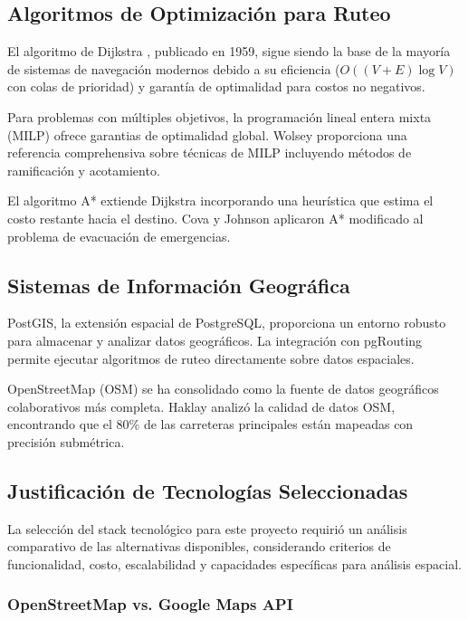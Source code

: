 \documentclass[conference]{IEEEtran}
\begin{document}
\subsection{Algoritmos de Optimización para Ruteo}

El algoritmo de Dijkstra \citep{dijkstra1959}, publicado en 1959, sigue siendo la base de la mayoría de sistemas de navegación modernos debido a su eficiencia ($O((V+E)\log V)$ con colas de prioridad) y garantía de optimalidad para costos no negativos.

Para problemas con múltiples objetivos, la programación lineal entera mixta (MILP) ofrece garantias de optimalidad global. Wolsey \citep{wolsey1998} proporciona una referencia comprehensiva sobre técnicas de MILP incluyendo métodos de ramificación y acotamiento.

El algoritmo A* \citep{hart1968} extiende Dijkstra incorporando una heurística que estima el costo restante hacia el destino. Cova y Johnson \citep{cova2003} aplicaron A* modificado al problema de evacuación de emergencias.

\subsection{Sistemas de Información Geográfica}

PostGIS, la extensión espacial de PostgreSQL, proporciona un entorno robusto para almacenar y analizar datos geográficos. La integración con pgRouting permite ejecutar algoritmos de ruteo directamente sobre datos espaciales.

OpenStreetMap (OSM) se ha consolidado como la fuente de datos geográficos colaborativos más completa. Haklay \citep{haklay2010} analizó la calidad de datos OSM, encontrando que el 80\% de las carreteras principales están mapeadas con precisión submétrica.

\subsection{Justificación de Tecnologías Seleccionadas}

La selección del stack tecnológico para este proyecto requirió un análisis comparativo de las alternativas disponibles, considerando criterios de funcionalidad, costo, escalabilidad y capacidades específicas para análisis espacial.

\subsubsection{OpenStreetMap vs. Google Maps API}
\end{document}
